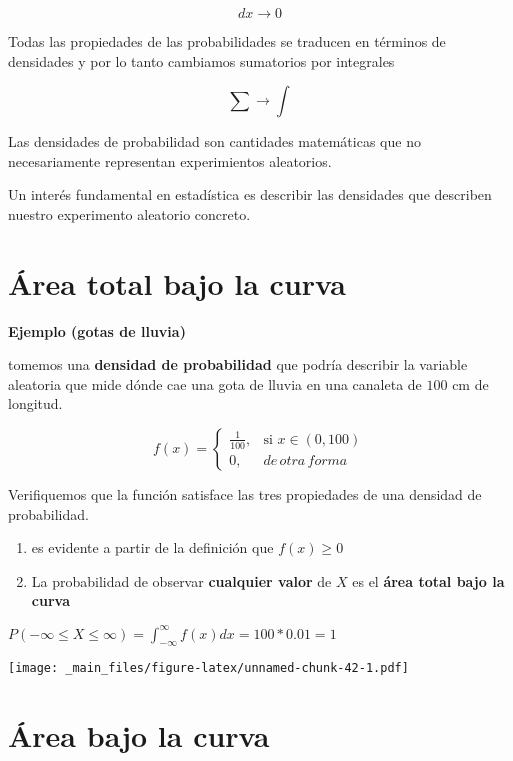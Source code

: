 \documentclass[
]{book}
\begin{document}
\[dx \rightarrow 0\]

Todas las propiedades de las probabilidades se traducen en términos de densidades y por lo tanto cambiamos sumatorios por integrales

\[\sum \rightarrow \int\]

Las densidades de probabilidad son cantidades matemáticas que no necesariamente representan experimientos aleatorios.

Un interés fundamental en estadística es describir las densidades que describen nuestro experimento aleatorio concreto.

\hypertarget{uxe1rea-total-bajo-la-curva}{%
\section{Área total bajo la curva}\label{uxe1rea-total-bajo-la-curva}}

\textbf{Ejemplo (gotas de lluvia)}

tomemos una \textbf{densidad de probabilidad} que podría describir la variable aleatoria que mide dónde cae una gota de lluvia en una canaleta de \(100\) cm de longitud.

\[
    f(x)= 
\begin{cases}
    \frac{1}{100},& \text{si } x\in (0,100)\\
    0,& de\, otra\, forma 
\end{cases}
\]

Verifiquemos que la función satisface las tres propiedades de una densidad de probabilidad.

\begin{enumerate}
\def\labelenumi{\arabic{enumi})}
\item
  es evidente a partir de la definición que \(f(x) \geq 0\)
\item
  La probabilidad de observar \textbf{cualquier valor} de \(X\) es el \textbf{área total bajo la curva}
\end{enumerate}

\(P( -\infty \leq X \leq \infty )= \int_{-\infty }^{\infty } f(x) dx = 100*0.01= 1\)

\texttt{[image: \_main\_files/figure-latex/unnamed-chunk-42-1.pdf]}

\hypertarget{uxe1rea-bajo-la-curva}{%
\section{Área bajo la curva}\label{uxe1rea-bajo-la-curva}}
\end{document}
